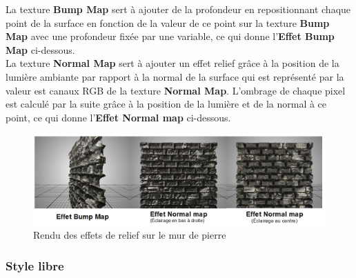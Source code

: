 La texture \textbf{Bump Map} sert à ajouter de la profondeur en repositionnant chaque point de la surface en fonction de la valeur de ce point sur la texture \textbf{Bump Map} avec une profondeur fixée par une variable, ce qui donne l'\textbf{Effet Bump Map} ci-dessous. \\

La texture \textbf{Normal Map} sert à ajouter un effet relief grâce à la position de la lumière ambiante par rapport à la normal de la surface qui est représenté par la valeur est canaux RGB de la texture \textbf{Normal Map}. L'ombrage de chaque pixel est calculé par la suite grâce à la position de la lumière et de la normal à ce point, ce qui donne l'\textbf{Effet Normal map} ci-dessous.

\begin{figure}[H]
    \centering
	\includegraphics[scale=0.62]{img/infog-image-rendu-mur-pierre.png}
	\caption{Rendu des effets de relief sur le mur de pierre}
	\label{fig:wallnormalbumprender}
\end{figure}

\subsubsection{Style libre}